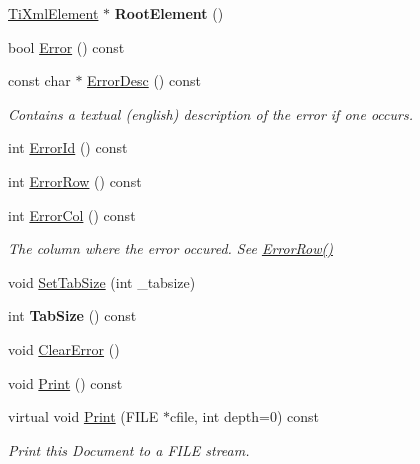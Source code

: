 \begin{DoxyCompactItemize}
\hyperlink{classTiXmlElement}{Ti\+Xml\+Element} $\ast$ {\bfseries Root\+Element} ()
\item 
bool \hyperlink{classTiXmlDocument_a348e68faad4a3498f413c51ee9bc321a}{Error} () const
\item 
\mbox{\label{classTiXmlDocument_aab511be262e84a003e3bb86f0215c8c2}} 
const char $\ast$ \hyperlink{classTiXmlDocument_aab511be262e84a003e3bb86f0215c8c2}{Error\+Desc} () const
\begin{DoxyCompactList}\small\item\em Contains a textual (english) description of the error if one occurs. \end{DoxyCompactList}\item 
int \hyperlink{classTiXmlDocument_abd928b49a646c8ed53e0453c555d96a2}{Error\+Id} () const
\item 
int \hyperlink{classTiXmlDocument_a062e5257128a7da31b0b2e38cd524600}{Error\+Row} () const
\item 
\mbox{\label{classTiXmlDocument_adea69de889449a2587afb8ee043f43f5}} 
int \hyperlink{classTiXmlDocument_adea69de889449a2587afb8ee043f43f5}{Error\+Col} () const
\begin{DoxyCompactList}\small\item\em The column where the error occured. See \hyperlink{classTiXmlDocument_a062e5257128a7da31b0b2e38cd524600}{Error\+Row()} \end{DoxyCompactList}\item 
void \hyperlink{classTiXmlDocument_a51dac56316f89b35bdb7d0d433ba988e}{Set\+Tab\+Size} (int \+\_\+tabsize)
\item 
\mbox{\label{classTiXmlDocument_a81e6ffeee8f5d025a171eabf79abdad7}} 
int {\bfseries Tab\+Size} () const
\item 
void \hyperlink{classTiXmlDocument_ac66b8c28db86363315712a3574e87c35}{Clear\+Error} ()
\item 
void \hyperlink{classTiXmlDocument_aa4e8c1498a76dcde7191c683e1220882}{Print} () const
\item 
\mbox{\label{classTiXmlDocument_aa9e166fae51da603641380a964f21eeb}} 
virtual void \hyperlink{classTiXmlDocument_aa9e166fae51da603641380a964f21eeb}{Print} (F\+I\+LE $\ast$cfile, int depth=0) const
\begin{DoxyCompactList}\small\item\em Print this Document to a F\+I\+LE stream. \end{DoxyCompactList}\item 

\end{DoxyCompactItemize}
